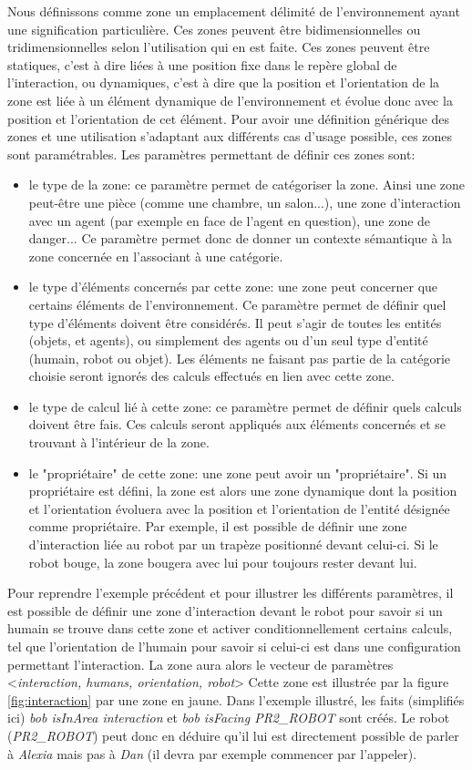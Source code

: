 \documentclass[a4paper,11pt,twoside]{StyleThese}
\begin{document}
Nous définissons comme zone un emplacement délimité de l'environnement ayant une signification particulière. Ces zones peuvent être bidimensionnelles ou tridimensionnelles selon l'utilisation qui en est faite. Ces zones peuvent être statiques, c'est à dire liées à une position fixe dans le repère global de l'interaction, ou dynamiques, c'est à dire que la position et l'orientation de la zone est liée à un élément dynamique de l'environnement et évolue donc avec la position et l'orientation de cet élément. Pour avoir une définition générique des zones et une utilisation s'adaptant aux différents cas d'usage possible, ces zones sont paramétrables. Les paramètres permettant de définir ces zones sont:
\begin{itemize}
\item le type de la zone: ce paramètre permet de catégoriser la zone. Ainsi une zone peut-être une pièce (comme une chambre, un salon...), une zone d'interaction avec un agent (par exemple en face de l'agent en question), une zone de danger...
Ce paramètre permet donc de donner un contexte sémantique à la zone concernée en l'associant à une catégorie.
\item le type d'éléments concernés par cette zone: une zone peut concerner que certains éléments de l'environnement. Ce paramètre permet de définir quel type d'éléments doivent être considérés. Il peut s'agir de toutes les entités (objets, et agents), ou simplement des agents ou d'un seul type d'entité (humain, robot ou objet). Les éléments ne faisant pas partie de la catégorie choisie seront ignorés des calculs effectués en lien avec cette zone.
\item le type de calcul lié à cette zone: ce paramètre permet de définir quels calculs doivent être fais. Ces calculs seront appliqués aux éléments concernés et se trouvant à l'intérieur de la zone.
\item le "propriétaire" de cette zone: une zone peut avoir un "propriétaire". Si un propriétaire est défini, la zone est alors une zone dynamique dont la position et l'orientation évoluera avec la position et l'orientation de l'entité désignée comme propriétaire. Par exemple, il est possible de définir une zone d'interaction liée au robot par un trapèze positionné devant celui-ci. Si le robot bouge, la zone bougera avec lui pour toujours rester devant lui.
\end{itemize}

Pour reprendre l'exemple précédent et pour illustrer les différents paramètres, il est possible de définir une zone d'interaction devant le robot pour savoir si un humain se trouve dans cette zone et activer conditionnellement certains calculs, tel que l'orientation de l'humain pour savoir si celui-ci est dans une configuration permettant l'interaction.
La zone aura alors le vecteur de paramètres <\textit{interaction, humans, orientation, robot}>
Cette zone est illustrée par la figure \ref{fig:interaction} par une zone en jaune.
Dans l'exemple illustré, les faits (simplifiés ici) \textit{bob isInArea interaction} et \textit{bob isFacing PR2\_ROBOT} sont créés. Le robot (\textit{PR2\_ROBOT}) peut donc en déduire qu'il lui est directement possible de parler à \textit{Alexia} mais pas à \textit{Dan} (il devra par exemple commencer par l'appeler).
\end{document}
